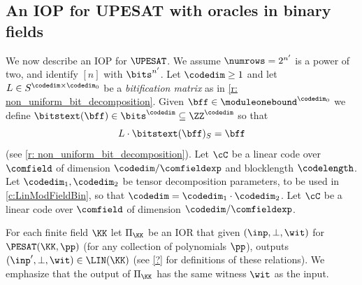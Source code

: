 \subsection{An IOP for UPESAT with oracles in binary fields}\label{s:iop_upesat}

We now describe an IOP for $\UPESAT$. 
% 
% 
We assume $\numrows=2^{n'}$ is a power of two, and identify $[n]$ with $\bits^{n'}$.   Let $\codedim\geq 1$ and let $L\in S^{\codedim\times \codedim_0}$ be a \emph{bitification matrix} as in \cref{r: non_uniform_bit_decomposition}. Given $\bff\in \moduleonebound^{\codedim_0}$ we define $\bitstext(\bff)\in \bits^\codedim\subseteq \ZZ^\codedim$ so that $$L \cdot \bitstext(\bff)_S = \bff$$ (see \cref{r: non_uniform_bit_decomposition}). 
Let $\cC$ be a linear code over $\comfield$ of dimension $\codedim/\comfieldexp$ and blocklength $\codelength$. Let $\codedim_1,\codedim_2$ be tensor decomposition parameters, to be used in \cref{c:LinModFieldBin}, so that $\codedim=\codedim_1\cdot \codedim_2$. Let $\cC$ be  a linear code  over $\comfield$ of dimension $\codedim/\comfieldexp$. 


%
%
For each finite field $\KK$  let $\Pi_\KK$ be an IOR that given $(\inp,\bot, \wit)$ for  $\PESAT(\KK,\pp)$ (for any collection of polynomials $\pp$), outputs $(\inp',\bot, \wit) \in \LIN(\KK)$ (see \cref{?} for definitions of these relations). 
We emphasize that the output of $\Pi_\KK$ has the same witness $\wit$ as the input.
 
